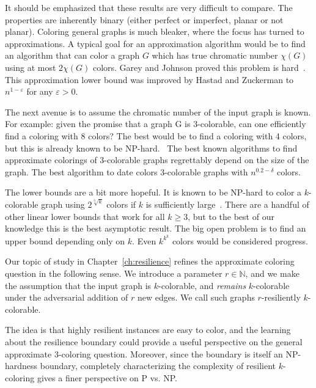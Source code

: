 It should be emphasized that these results are very difficult to compare.  The
properties are inherently binary (either perfect or imperfect, planar or not
planar). Coloring general graphs is much bleaker, where the focus has turned to
approximations. A typical goal for an approximation algorithm would be to find
an algorithm that can color a graph $G$ which has true chromatic number
$\chi(G)$ using at most $2\chi(G)$ colors. Garey and Johnson proved this
problem is hard~\cite{GareyJ79}.  This approximation lower bound was improved
by Hastad and Zuckerman to $n^{1-\varepsilon}$ for any $\varepsilon >
0$.~\cite{Ha99,Zu07}

The next avenue is to assume the chromatic number of the input graph is known.
For example: given the promise that a graph G is 3-colorable, can one
efficiently find a coloring with 8 colors? The best would be to find a coloring
with 4 colors, but this is already known to be NP-hard.~\cite{GuKh2000} The
best known algorithms to find approximate colorings of 3-colorable graphs
regrettably depend on the size of the graph. The best algorithm to date colors
3-colorable graphs with $n^{0.2-\delta}$ colors.~\cite{KawarabayashiT14} 

The lower bounds are a bit more hopeful. It is known to be NP-hard to color a
$k$-colorable graph using $2^{\sqrt[3]{k}}$ colors if $k$ is sufficiently
large~\cite{Huang13}.  There are a handful of other linear lower bounds that
work for all $k \geq 3$, but to the best of our knowledge this is the best
asymptotic result. The big open problem is to find an upper bound depending
only on $k$. Even $k^{k^k}$ colors would be considered progress.

Our topic of study in Chapter~\ref{ch:resilience} refines the approximate
coloring question in the following sense. We introduce a parameter $r \in
\mathbb{N}$, and we make the assumption that the input graph is $k$-colorable,
and \emph{remains} $k$-colorable under the adversarial addition of $r$ new
edges. We call such graphs $r$-resiliently $k$-colorable. 

The idea is that highly resilient instances are easy to color, and the learning
about the resilience boundary could provide a useful perspective on the general
approximate 3-coloring question. Moreover, since the boundary is itself an
NP-hardness boundary, completely characterizing the complexity of resilient
$k$-coloring gives a finer perspective on P vs. NP.

